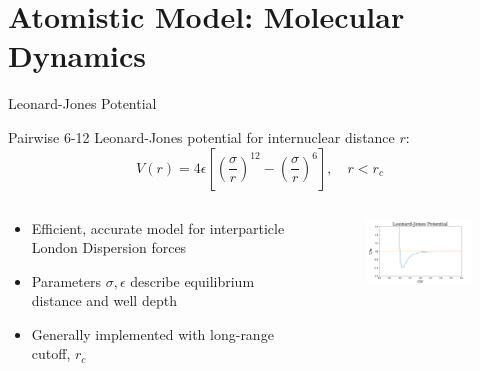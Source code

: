 \documentclass[professionalfont]{beamer}
\theoremstyle{remark}
\begin{document}
\section{Atomistic Model: Molecular Dynamics}

\begin{frame}{Leonard-Jones Potential}


	Pairwise 6-12 Leonard-Jones potential for internuclear distance $r$:
	\begin{equation}
		V(r)=4\epsilon\left[ \left( \frac{\sigma}{r} \right)^{12}-\left( \frac{\sigma}{r} \right)^6 \right],\quad r<r_c
	\end{equation}
	
	\vspace*{10pt}

	\begin{columns}
		
		\begin{column}{.5\paperwidth}

			\begin{itemize}
				\item Efficient, accurate model for interparticle London Dispersion forces
				\item Parameters $\sigma,\epsilon$ describe equilibrium distance and well depth
				\item Generally implemented with long-range cutoff, $r_c$
			\end{itemize}

			

		\end{column}

		\begin{column}{.4\paperwidth}
			
			\begin{figure}
				\centering
				\includegraphics[width = 2in]{media/lg_pot.png}

			\end{figure}
		
		\end{column}

	\end{columns}

	
\end{frame}
\end{document}

